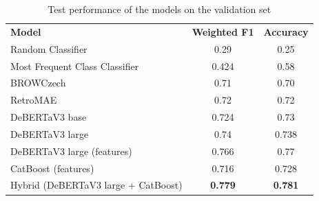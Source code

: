 \begin{table}[H]
  \centering
  \begin{tabular}{lcc}

    \textbf{Model} & \textbf{Weighted F1} & \textbf{Accuracy} \\ 
    Random Classifier & 0.29 & 0.25 \\
    Most Frequent Class Classifier & 0.424 & 0.58 \\
    BROWCzech & 0.71 & 0.70 \\ 
    RetroMAE & 0.72 & 0.72 \\ 
    DeBERTaV3 base & 0.724 & 0.73 \\ 
    DeBERTaV3 large & 0.74 & 0.738 \\ 
    DeBERTaV3 large (features) & 0.766 & 0.77 \\ 
    \ac{CatBoost} (features) & 0.716 & 0.728 \\ 
    Hybrid (DeBERTaV3 large + \ac{CatBoost}) & \textbf{0.779} & \textbf{0.781} \\ 
  \end{tabular}
  \caption{Test performance of the models on the validation set}
  \label{tab:validation_scores}
\end{table}

